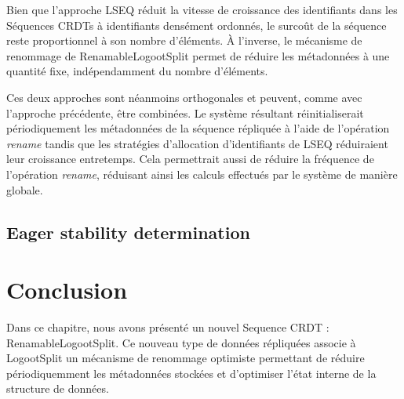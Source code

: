 \documentclass[12pt]{thesul}
\begin{document}
Bien que l'approche LSEQ réduit la vitesse de croissance des identifiants dans les Séquences \acp{CRDT} à identifiants densément ordonnés, le surcoût de la séquence reste proportionnel à son nombre d'éléments.
À l'inverse, le mécanisme de renommage de RenamableLogootSplit permet de réduire les métadonnées à une quantité fixe, indépendamment du nombre d'éléments.

Ces deux approches sont néanmoins orthogonales et peuvent, comme avec l'approche précédente, être combinées.
Le système résultant réinitialiserait périodiquement les métadonnées de la séquence répliquée à l'aide de l'opération \emph{rename} tandis que les stratégies d'allocation d'identifiants de LSEQ réduiraient leur croissance entretemps.
Cela permettrait aussi de réduire la fréquence de l'opération \emph{rename}, réduisant ainsi les calculs effectués par le système de manière globale.


\subsection{Eager stability determination}



\section{Conclusion}

Dans ce chapitre, nous avons présenté un nouvel Sequence \ac{CRDT} : RenamableLogootSplit.
Ce nouveau type de données répliquées associe à LogootSplit un mécanisme de renommage optimiste permettant de réduire périodiquemment les métadonnées stockées et d'optimiser l'état interne de la structure de données.
\end{document}
